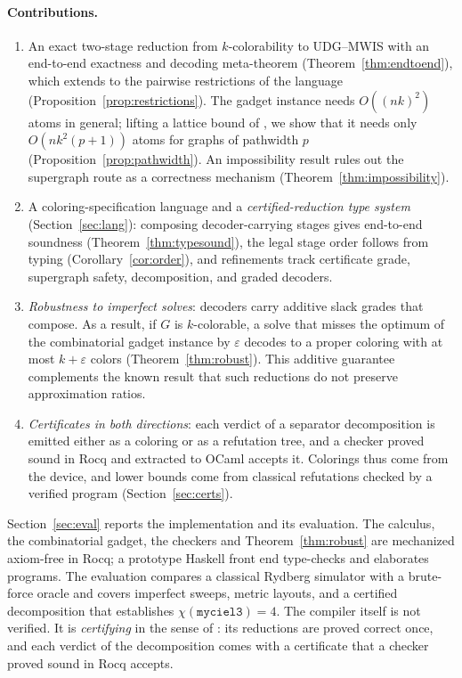 \documentclass[a4paper,fleqn]{cas-sc}
\begin{document}
\paragraph{Contributions.}
\begin{enumerate}[label=(\arabic*),leftmargin=2.2em,itemsep=1pt]
  \item An exact two-stage reduction from $k$-colorability to UDG--MWIS with an
        end-to-end exactness and decoding meta-theorem
        (Theorem~\ref{thm:endtoend}), which extends to the pairwise restrictions of
        the language (Proposition~\ref{prop:restrictions}). The gadget instance
        needs $O((nk)^2)$ atoms in general; lifting a lattice bound of
        \citet[App.~A]{Nguyen2023}, we show that it needs only $O(nk^2(p+1))$ atoms
        for graphs of pathwidth $p$ (Proposition~\ref{prop:pathwidth}). An
        impossibility result rules out the supergraph route as a correctness
        mechanism (Theorem~\ref{thm:impossibility}).
  \item A coloring-specification language and a \emph{certified-reduction type
        system} (Section~\ref{sec:lang}): composing decoder-carrying stages gives
        end-to-end soundness (Theorem~\ref{thm:typesound}), the legal stage order
        follows from typing (Corollary~\ref{cor:order}), and refinements track
        certificate grade, supergraph safety, decomposition, and graded decoders.
  \item \emph{Robustness to imperfect solves}: decoders carry additive slack grades
        that compose. As a result, if $G$ is $k$-colorable, a solve that misses the
        optimum of the combinatorial gadget instance by $\varepsilon$ decodes to a
        proper coloring with at most $k+\varepsilon$ colors
        (Theorem~\ref{thm:robust}). This additive guarantee complements the known
        result that such reductions do not preserve approximation ratios.
  \item \emph{Certificates in both directions}: each verdict of a separator
        decomposition is emitted either as a coloring or as a refutation tree, and a
        checker proved sound in Rocq and extracted to OCaml accepts it. Colorings
        thus come from the device, and lower bounds come from classical refutations
        checked by a verified program (Section~\ref{sec:certs}).
\end{enumerate}

\noindent Section~\ref{sec:eval} reports the implementation and its evaluation. The
calculus, the combinatorial gadget, the checkers and Theorem~\ref{thm:robust} are
mechanized axiom-free in Rocq; a prototype Haskell front end type-checks and
elaborates programs. The evaluation compares a classical Rydberg simulator with a
brute-force oracle and covers imperfect sweeps, metric layouts, and a certified
decomposition that establishes $\chi(\texttt{myciel3})=4$. The compiler itself is not
verified. It is \emph{certifying} in the sense of \citet{McConnell2011}: its
reductions are proved correct once, and each verdict of the decomposition comes with
a certificate that a checker proved sound in Rocq accepts.
\end{document}
